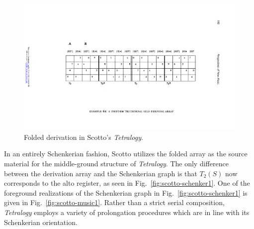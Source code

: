 \begin{example}
	\begin{figure}[H]
    	\centering
		\includegraphics[width=6.5in]{figures/scotto-folded.pdf}
		\caption[Folded derivation in Scotto's \emph{Tetralogy}]{Folded derivation in Scotto's \emph{Tetralogy}.}
    	\label{fig:scotto-folded}
	\end{figure}
	\noindent In an entirely Schenkerian fashion, Scotto utilizes the folded array as the source material for the middle-ground structure of \emph{Tetralogy}. The only difference between the derivation array and the Schenkerian graph is that $T_2(S)$ now corresponds to the alto register, as seen in Fig.~\ref{fig:scotto-schenker1}. One of the foreground realizations of the Schenkerian graph in Fig.~\ref{fig:scotto-schenker1} is given in Fig.~\ref{fig:scotto-music1}. Rather than a strict serial composition, \emph{Tetralogy} employs a variety of prolongation procedures which are in line with its Schenkerian orientation.
	\begin{figure}[H]
    	\centering

\end{figure}
\end{example}
